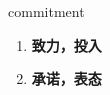 
\begin{frame}
{\huge commitment}
\begin{center}
\begin{enumerate}\Large
  \item \textbf{致力，投入}
  \item \textbf{承诺，表态}
\end{enumerate}
\end{center}
\end{frame}
